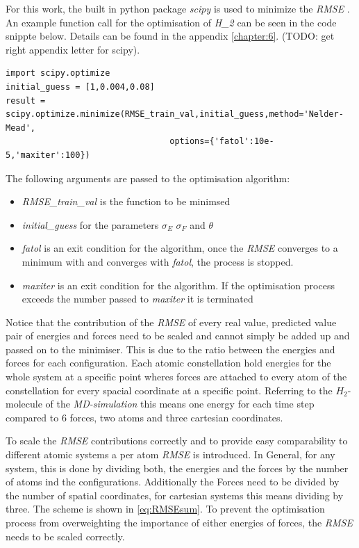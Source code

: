 For this work, the built in python package \textit{scipy} is used to minimize the \textit{RMSE} . An example function call  for the optimisation of \textit{H_2} can be seen in the code snippte below. Details can be found in the appendix \ref{chapter:6}. (TODO: get right appendix letter for scipy).

\begin{lstlisting}
import scipy.optimize
initial_guess = [1,0.004,0.08]
result = scipy.optimize.minimize(RMSE_train_val,initial_guess,method='Nelder-Mead',
                                 options={'fatol':10e-5,'maxiter':100})
\end{lstlisting}

The following arguments are passed to the optimisation algorithm: 

\begin{itemize}
	\item \textit{RMSE_train_val} is the function to be minimsed
	\item \textit{initial_guess} for the parameters $\sigma_E$ $\sigma_F$ and $\theta$
	\item \textit{fatol} is an exit condition for the algorithm, once the \textit{RMSE} converges to a minimum with and converges with \textit{fatol}, the process is stopped.
	\item \textit{maxiter} is an exit condition for the algorithm. If the optimisation process exceeds the number passed to \textit{maxiter} it is terminated
\end{itemize}

Notice that the contribution of the \textit{RMSE} of every real value, predicted value pair of energies and forces need to be scaled and cannot simply be added up and passed on to the minimiser. This is due to the ratio between the energies and forces for each configuration. Each atomic constellation hold energies for the whole system at a specific point wheres forces are attached to every atom of the constellation for every spacial coordinate at a specific point. Referring to the $H_2$-molecule of the \textit{MD-simulation} this means one energy for each time step compared to 6 forces, two atoms and three cartesian coordinates. 

To scale the \textit{RMSE} contributions correctly and to provide easy comparability to different atomic systems a per atom \textit{RMSE} is introduced. In General, for any system, this is done by dividing both, the energies and the forces by the number of atoms ind the configurations. Additionally the Forces need to be divided by the number of spatial coordinates, for cartesian systems this means dividing by three. The scheme is shown in \ref{eq:RMSEsum}. To prevent the optimisation process from overweighting the importance of either energies of forces, the \textit{RMSE} needs to be scaled correctly.

